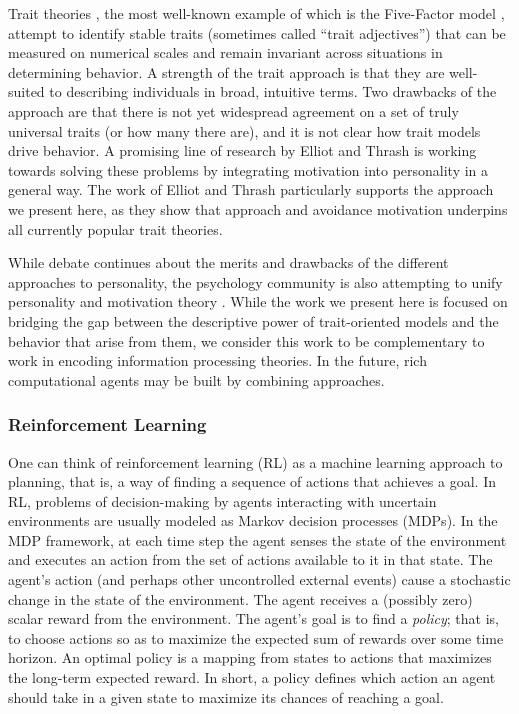 Trait theories \cite{cervone2009personality}, the most well-known example of which is the Five-Factor model \cite{mccrae2008handbook}, attempt to identify stable traits (sometimes called ``trait adjectives'') that can be measured on numerical scales and remain invariant across situations in determining behavior.  A strength of the trait approach is that they are well-suited to describing individuals in broad, intuitive terms.  Two drawbacks of the approach are that there is not yet widespread agreement on a set of truly universal traits (or how many there are), and it is not clear how trait models drive behavior.  A promising line of research by Elliot and Thrash \cite{elliot2002approach-avoidance} is working towards solving these problems by integrating motivation into personality in a general way.  The work of Elliot and Thrash particularly supports the approach we present here, as they show that approach and avoidance motivation underpins all currently popular trait theories.

While debate continues about the merits and drawbacks of the different approaches to personality, the psychology community is also attempting to unify personality and motivation theory \cite{mischel2008handbook}. While the work we present here is focused on bridging the gap between the descriptive power of trait-oriented models and the behavior that arise from them, we consider this work to be complementary to work in encoding information processing theories.  In the future, rich computational agents may be built by combining approaches.

\subsubsection{Reinforcement Learning}

One can think of reinforcement learning (RL) as a machine learning approach to planning, that is, a way of finding a sequence of actions that achieves a goal.  In RL, problems of decision-making by agents interacting with uncertain environments are usually modeled as Markov decision processes (MDPs). In the MDP framework, at each time step the agent senses the state of the environment and executes an action from the set of actions available to it in that state. The agent's action (and perhaps other uncontrolled external events) cause a stochastic change in the state of the environment. The agent receives a (possibly zero) scalar reward from the environment. The agent's goal is to find a {\it policy}; that is, to choose actions so as to maximize the expected sum of rewards over some time horizon. An optimal policy is a mapping from states to actions that maximizes the long-term expected reward.  In short, a policy defines which action an agent should take in a given state to maximize its chances of reaching a goal.

